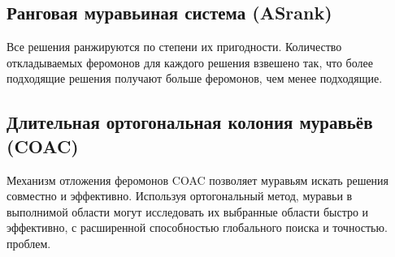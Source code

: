 \documentclass{book}
\begin{document}
\subsection*{Ранговая муравьиная система (ASrank)}
Все решения ранжируются по степени их пригодности. Количество откладываемых феромонов для каждого решения взвешено так, что более подходящие решения получают больше феромонов, чем менее подходящие.
\sloppypar \subsection*{Длительная ортогональная колония муравьёв (COAC)}
Механизм отложения феромонов COAC позволяет муравьям искать решения совместно и эффективно. Используя ортогональный метод, муравьи в выполнимой области могут исследовать их выбранные области быстро и эффективно, с расширенной способностью глобального поиска и точностью.
 проблем.
\end{document}
